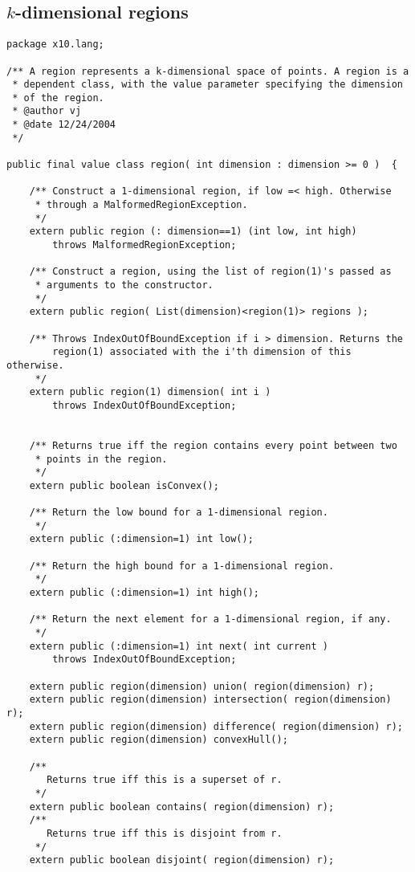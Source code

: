 \documentclass{article}
\begin{document}
\subsection{$k$-dimensional regions}
{\footnotesize
\begin{verbatim}
package x10.lang;

/** A region represents a k-dimensional space of points. A region is a
 * dependent class, with the value parameter specifying the dimension
 * of the region.
 * @author vj 
 * @date 12/24/2004
 */

public final value class region( int dimension : dimension >= 0 )  {

    /** Construct a 1-dimensional region, if low =< high. Otherwise
     * through a MalformedRegionException.
     */
    extern public region (: dimension==1) (int low, int high) 
        throws MalformedRegionException;

    /** Construct a region, using the list of region(1)'s passed as
     * arguments to the constructor.
     */
    extern public region( List(dimension)<region(1)> regions );

    /** Throws IndexOutOfBoundException if i > dimension. Returns the
        region(1) associated with the i'th dimension of this otherwise.
     */
    extern public region(1) dimension( int i ) 
        throws IndexOutOfBoundException;


    /** Returns true iff the region contains every point between two
     * points in the region.
     */
    extern public boolean isConvex();

    /** Return the low bound for a 1-dimensional region.
     */
    extern public (:dimension=1) int low();

    /** Return the high bound for a 1-dimensional region.
     */
    extern public (:dimension=1) int high();

    /** Return the next element for a 1-dimensional region, if any.
     */
    extern public (:dimension=1) int next( int current ) 
        throws IndexOutOfBoundException; 

    extern public region(dimension) union( region(dimension) r);
    extern public region(dimension) intersection( region(dimension) r);
    extern public region(dimension) difference( region(dimension) r);
    extern public region(dimension) convexHull();

    /**
       Returns true iff this is a superset of r.
     */
    extern public boolean contains( region(dimension) r);
    /**
       Returns true iff this is disjoint from r.
     */
    extern public boolean disjoint( region(dimension) r);


\end{verbatim}}
\end{document}
